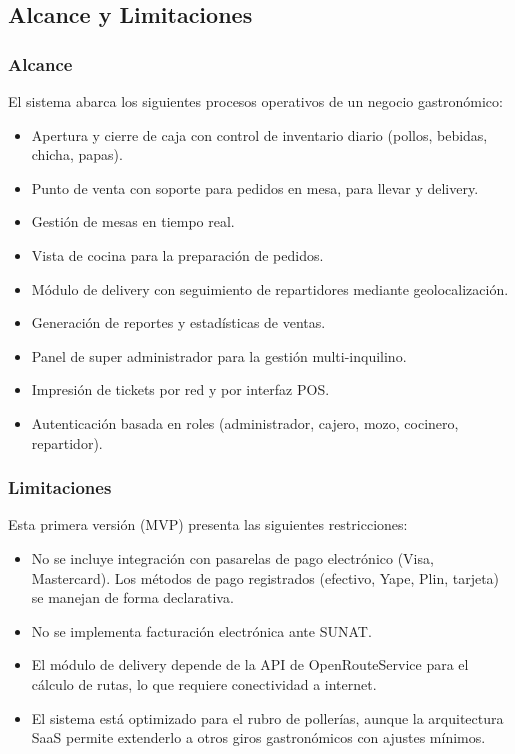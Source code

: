 \documentclass[12pt, a4paper]{article}
\begin{document}
\subsection{Alcance y Limitaciones}

\subsubsection*{Alcance}

El sistema abarca los siguientes procesos operativos de un negocio gastronómico:

\begin{itemize}[leftmargin=2cm]
    \item Apertura y cierre de caja con control de inventario diario (pollos, bebidas, chicha, papas).
    \item Punto de venta con soporte para pedidos en mesa, para llevar y delivery.
    \item Gestión de mesas en tiempo real.
    \item Vista de cocina para la preparación de pedidos.
    \item Módulo de delivery con seguimiento de repartidores mediante geolocalización.
    \item Generación de reportes y estadísticas de ventas.
    \item Panel de super administrador para la gestión multi-inquilino.
    \item Impresión de tickets por red y por interfaz POS.
    \item Autenticación basada en roles (administrador, cajero, mozo, cocinero, repartidor).
\end{itemize}

\subsubsection*{Limitaciones}

Esta primera versión (MVP) presenta las siguientes restricciones:

\begin{itemize}[leftmargin=2cm]
    \item No se incluye integración con pasarelas de pago electrónico (Visa, Mastercard). Los métodos de pago registrados (efectivo, Yape, Plin, tarjeta) se manejan de forma declarativa.
    \item No se implementa facturación electrónica ante SUNAT.
    \item El módulo de delivery depende de la API de OpenRouteService para el cálculo de rutas, lo que requiere conectividad a internet.
    \item El sistema está optimizado para el rubro de pollerías, aunque la arquitectura SaaS permite extenderlo a otros giros gastronómicos con ajustes mínimos.
\end{itemize}
\end{document}

